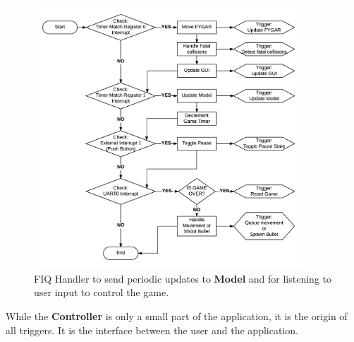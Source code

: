   \begin{figure}[H]
    \centering
    \includegraphics[width=0.9\textwidth]{images/fiq-handler.png}
    \caption{\label{fig:fiq-handler} FIQ Handler to send periodic updates to \textbf{Model} and for listening to user input to control the game.}
  \end{figure}


  While the \textbf{Controller} is only a small part of the application, it is the origin of all triggers. It is the interface between the user and the application.

